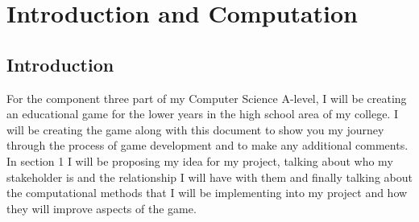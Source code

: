 \documentclass[12pt]{report}
\begin{document}

\pagebreak


\printnomenclature
{}

\pagebreak




\setcounter{secnumdepth}{3}

\chapter{Introduction and Computation}

\section{Introduction}
For the component three part of my Computer Science A-level, I will be creating an educational game for the lower years in the high school area of my college. I will be creating the game along with this document to show you my journey through the process of game development and to make any additional comments. In section 1 I will be proposing my idea for my project, talking about who my stakeholder is and the relationship I will have with them and finally talking about the computational methods that I will be implementing into my project and how they will improve aspects of the game.
\end{document}

